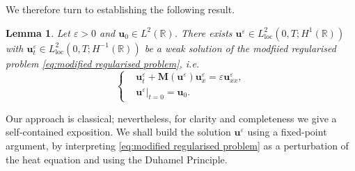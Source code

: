 \documentclass[11pt,a4paper,reqno]{amsart}
\numberwithin{equation}{section}
\newtheorem{lemma}{Lemma}[section]
\theoremstyle{definition}
\theoremstyle{remark}
\newcommand{\bu}{\mathbf{u}}
\newcommand{\loc}{\mathrm{loc}}
\newcommand{\bM}{\mathbf{M}}
\begin{document}
{We therefore turn to establishing the following result.

\begin{lemma}\label{lem:first existence using fixed point}
    Let $\varepsilon>0$ and $\bu_0 \in L^2(\mathbb{R})$. There exists $\bu^\varepsilon \in L^2_{\loc}(0,T;H^1(\mathbb{R}))$ with $\bu^\varepsilon_t \in L^2_{\loc}(0,T;H^{-1}(\mathbb{R}))$ be a weak solution of the modfiied regularised problem \eqref{eq:modified regularised problem}, \textit{i.e.} 
    \begin{equation*}
    \left\lbrace\begin{aligned}
        &\bu^\varepsilon_t + \bM(\bu^\varepsilon)\bu^\varepsilon_x = \varepsilon  \bu^\varepsilon_{xx}, \\ 
        &\bu^\varepsilon|_{t=0} = \bu_0. 
    \end{aligned}\right.
\end{equation*}
\end{lemma}


Our approach is classical; nevertheless, for clarity and completeness we give a self-contained exposition. We shall build the solution $\bu^\varepsilon$ using a fixed-point argument, by interpreting \eqref{eq:modified regularised problem} as a perturbation of the heat equation and using the Duhamel Principle. 

\smallskip 

}
\end{document}

